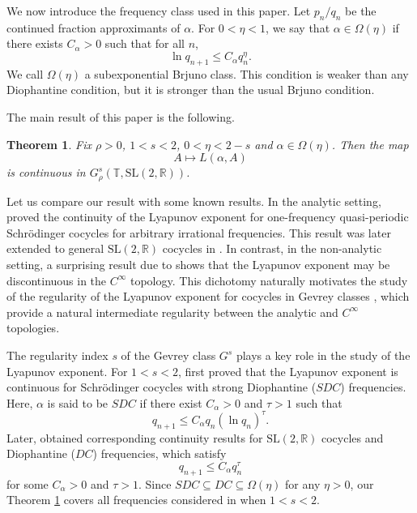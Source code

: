 \documentclass[reqno,12pt]{amsart}
\theoremstyle{plain}
\newtheorem{theorem}{Theorem}[section]
\theoremstyle{definition}
\numberwithin{equation}{section}
\begin{document}
We now introduce the frequency class used in this paper. Let $p_n/q_n$ be the continued fraction approximants of $\alpha$.
For $0<\eta<1$, we say that $\alpha\in\Omega(\eta)$ if there exists $C_{\alpha}>0$ such that for all $n$,
\begin{equation}\label{brjuno}
    \ln q_{n+1}\leqslant C_{\alpha} q_{n}^{\eta}.
\end{equation}
We call $\Omega(\eta)$ a subexponential Brjuno class. This condition is weaker than any Diophantine condition, but it is stronger than the usual Brjuno condition.

The main result of this paper is the following.



\begin{theorem}\label{mainthm}
    Fix $\rho>0$, $1<s<2$, $0<\eta<2-s$ and $\alpha\in \Omega(\eta)$. Then the map 
    \begin{equation*}
        A\mapsto L(\alpha,A)
    \end{equation*}
    is continuous in $G^{s}_{\rho}(\mathbb{T},\mathrm{SL}(2,\mathbb{R}))$.
\end{theorem}

Let us compare our result with some known results. In the analytic setting, \cite{MR1933451} proved the continuity of the Lyapunov exponent for one-frequency quasi-periodic Schr\"odinger cocycles for arbitrary irrational frequencies. This result was later extended to general $\mathrm{SL}(2,\mathbb{R})$ cocycles in \cite{MR2563096}. In contrast, in the non-analytic setting, a surprising result due to \cite{MR3127804} shows that the Lyapunov exponent may be discontinuous in the $C^{\infty}$ topology. This dichotomy naturally motivates the study of the regularity of the Lyapunov exponent for cocycles in Gevrey classes \cites{MR2108112,MR3291922,MR4477429,powell2025large, MR4811662}, which provide a natural intermediate regularity between the analytic and $C^{\infty}$ topologies.


The regularity index $s$ of the Gevrey class $G^{s}$ plays a key role in the study of the Lyapunov exponent. For $1<s<2$, \cite{MR2108112} first proved that the Lyapunov exponent is continuous for Schr\"odinger cocycles with strong Diophantine ($SDC$) frequencies. Here, $\alpha$ is said to be $SDC$ if there exist $C_{\alpha}>0$ and $\tau>1$ such that
\begin{equation*}
    q_{n+1}\leqslant C_{\alpha} q_{n}(\ln q_{n})^{\tau}.
\end{equation*}
Later, \cite{MR4477429} obtained corresponding continuity results for $\mathrm{SL}(2,\mathbb{R})$ cocycles and Diophantine ($DC$) frequencies, which satisfy
\begin{equation*}
    q_{n+1}\leqslant C_{\alpha}q_{n}^{\tau}
\end{equation*}
for some $C_{\alpha}>0$ and $\tau>1$. Since $SDC\subseteq DC\subseteq \Omega(\eta)$ for any $\eta>0$, our Theorem \ref{mainthm} covers all frequencies considered in \cites{MR2108112,MR4477429} when $1<s<2$.
\end{document}
